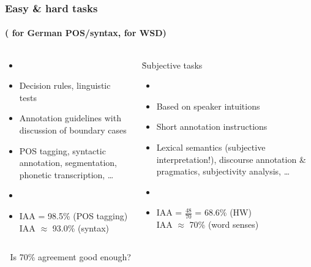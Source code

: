 \documentclass[t]{beamer} %
\begin{document}
\begin{frame}
  \frametitle{Easy \& hard tasks}
  \framesubtitle{(\citealt{Brants:00a} for German POS/syntax, \citealt{Veronis:98} for WSD)}

  \begin{columns}
    \begin{column}{55mm}
      \centerline{}

      \begin{itemize}
      \item[]
      \item Decision rules, linguistic tests
      \item Annotation guidelines with discussion of boundary cases
      \item POS tagging, syntactic annotation, segmentation,
        phonetic transcription, \ldots
      \item[]
      \item<3->[\So] IAA = 98.5\% (POS tagging)\\
        IAA $\approx$ 93.0\% (syntax)
      \end{itemize}
    \end{column}
    \begin{column}{55mm}
      \centerline{\h{Subjective tasks}}
      
      \begin{itemize}
      \item[]\ungap[.5]
      \item Based on speaker intuitions
      \item Short annotation instructions
      \item Lexical semantics (subjective interpretation!), discourse
        annotation \& pragmatics, subjectivity analysis, \ldots
      \item[]
      \item<4->[\So] IAA = $\frac{48}{70}$ = 68.6\% (HW)\\
        IAA $\approx$ 70\% (word senses)
      \end{itemize}
    \end{column}
  \end{columns}
  \gap{}
\end{frame}

\begin{frame}[c]
  \begin{center}
    \Large\hand$\;$
    Is 70\% agreement good enough?
  \end{center}
\end{frame}
\end{document}
